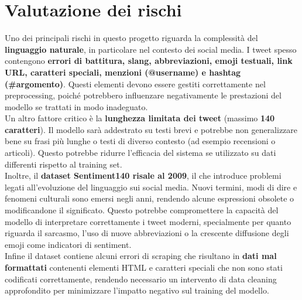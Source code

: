 \documentclass[12pt,a4paper]{report} %
\begin{document}
\section{Valutazione dei rischi}
Uno dei principali rischi in questo progetto riguarda la complessità del \textbf{linguaggio naturale}, in particolare nel contesto dei social media. I tweet spesso contengono \textbf{errori di battitura, slang, abbreviazioni, emoji testuali, link URL, caratteri speciali, menzioni (@username) e hashtag (\#argomento)}. Questi elementi devono essere gestiti correttamente nel preprocessing, poiché potrebbero influenzare negativamente le prestazioni del modello se trattati in modo inadeguato.\\
Un altro fattore critico è la \textbf{lunghezza limitata dei tweet} (massimo \textbf{140 caratteri}). Il modello sarà addestrato su testi brevi e potrebbe non generalizzare bene su frasi più lunghe o testi di diverso contesto (ad esempio recensioni o articoli). Questo potrebbe ridurre l'efficacia del sistema se utilizzato su dati differenti rispetto al training set.\\Inoltre, il \textbf{dataset Sentiment140 risale al 2009}, il che introduce problemi legati all’evoluzione del linguaggio sui social media. Nuovi termini, modi di dire e fenomeni culturali sono emersi negli anni, rendendo alcune espressioni obsolete o modificandone il significato. Questo potrebbe compromettere la capacità del modello di interpretare correttamente i tweet moderni, specialmente per quanto riguarda il sarcasmo, l’uso di nuove abbreviazioni o la crescente diffusione degli emoji come indicatori di sentiment.\\Infine il dataset contiene alcuni errori di scraping che risultano in \textbf{dati mal formattati} contenenti elementi HTML e caratteri speciali che non sono stati codificati correttamente, rendendo necessario un intervento di data cleaning approfondito per minimizzare l'impatto negativo sul training del modello. 
\end{document}
